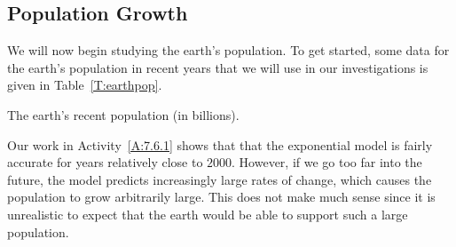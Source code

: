 

\subsection*{Population Growth}

We will now begin studying the earth's population.  To get started, some data for the earth's population in recent years that we will use in our investigations is given in Table~\ref{T:earthpop}.

\begin{margintable}[6cm]

\begin{center}
\end{center}

\caption{The earth's recent population (in billions).}
\label{T:earthpop}
\end{margintable}


Our work in Activity~\ref{A:7.6.1} shows that that the exponential model is fairly accurate for years 
relatively close to $2000$.  However, if we go too far into the
future, the model predicts increasingly large rates of change, which
causes the population to grow arbitrarily large.  This does not make
much sense since it is unrealistic to expect that the earth would be able to support
such a large population.  

